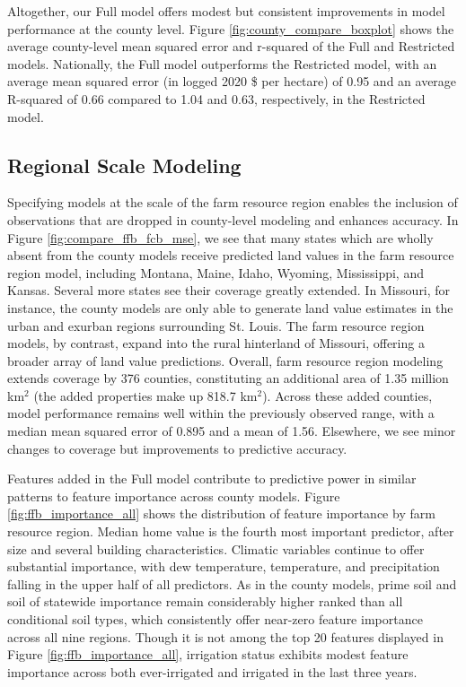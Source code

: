 \documentclass[12pt]{article}
\begin{document}
Altogether, our Full model offers modest but consistent improvements in model performance at the county level. Figure \ref{fig:county_compare_boxplot} shows the average county-level mean squared error and r-squared of the Full and Restricted models. Nationally, the Full model outperforms the Restricted model, with an average mean squared error (in logged 2020 \$ per hectare) of 0.95 and an average R-squared of 0.66 compared to 1.04 and 0.63, respectively, in the Restricted model.

\subsection{Regional Scale Modeling}

Specifying models at the scale of the farm resource region enables the inclusion of observations that are dropped in county-level modeling and enhances accuracy. In Figure \ref{fig:compare_ffb_fcb_mse}, we see that many states which are wholly absent from the county models receive predicted land values in the farm resource region model, including Montana, Maine, Idaho, Wyoming, Mississippi, and Kansas. Several more states see their coverage greatly extended. In Missouri, for instance, the county models are only able to generate land value estimates in the urban and exurban regions surrounding St. Louis. The farm resource region models, by contrast, expand into the rural hinterland of Missouri, offering a broader array of land value predictions. Overall, farm resource region modeling extends coverage by 376 counties, constituting an additional area of 1.35 million km$^2$ (the added properties make up 818.7 km$^2$). Across these added counties, model performance remains well within the previously observed range, with a median mean squared error of 0.895 and a mean of 1.56. Elsewhere, we see minor changes to coverage but improvements to predictive accuracy.

Features added in the Full model contribute to predictive power in similar patterns to feature importance across county models. Figure \ref{fig:ffb_importance_all} shows the distribution of feature importance by farm resource region. Median home value is the fourth most important predictor, after size and several building characteristics. Climatic variables continue to offer substantial importance, with dew temperature, temperature, and precipitation falling in the upper half of all predictors. As in the county models, prime soil and soil of statewide importance remain considerably higher ranked than all conditional soil types, which consistently offer near-zero feature importance across all nine regions. Though it is not among the top 20 features displayed in Figure \ref{fig:ffb_importance_all}, irrigation status exhibits modest feature importance across both ever-irrigated and irrigated in the last three years.
\end{document}
